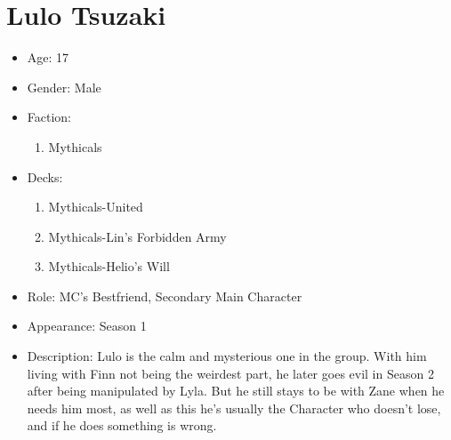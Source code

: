 \section{Lulo Tsuzaki}
\begin{itemize}
	\item Age: 17
	\item Gender: Male
	\item Faction:
	      \begin{enumerate}
		      \item Mythicals
	      \end{enumerate}
	\item Decks:
	      \begin{enumerate}
		      \item Mythicals-United
		      \item Mythicals-Lin’s Forbidden Army
		      \item Mythicals-Helio’s Will
	      \end{enumerate}
	\item Role: MC's Bestfriend, Secondary Main Character
	\item Appearance: Season 1
	\item Description: Lulo is the calm and mysterious one in the group. With him living with Finn
	      not being the weirdest part, he later goes evil in Season 2 after being manipulated by Lyla. But
	      he still stays to be with Zane when he needs him most, as well as this he's usually the Character
	      who doesn't lose, and if he does something is wrong.
\end{itemize}
\newpage
